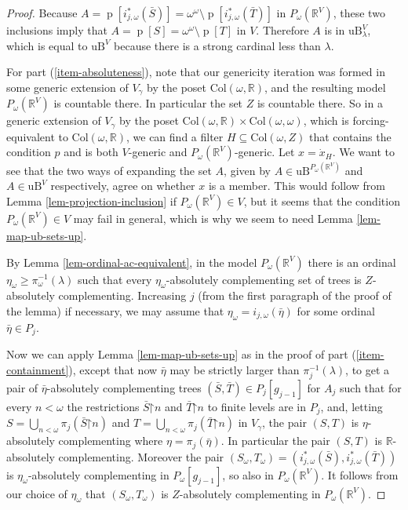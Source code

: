 \documentclass[fleqn, 11pt]{amsart}
\theoremstyle{plain}
\theoremstyle{definition}
\theoremstyle{remark}
\newcommand{\uB}{\mathrm{uB}}
\newcommand{\Col}{\mathrm{Col}}
\newcommand{\restrict}{\mathord{\restriction}}
\DeclareMathOperator{\p}{p}
\begin{document}
\begin{proof}
Because $A = \p[i_{j,\omega}^*(\bar{S})] = \omega^\omega \setminus \p[i_{j,\omega}^*(\bar{T})]$ in $P_\omega(\mathbb{R}^V)$, these two inclusions imply that $A = \p[S] = \omega^\omega \setminus \p[T]$ in $V$. Therefore $A$ is in $\uB_\lambda^V$, which is equal to $\uB^V$ because there is a strong cardinal less than $\lambda$.

For part (\ref{item-absoluteness}), note that our genericity iteration was formed in some generic extension of $V_{\gamma}$ by the poset $\Col(\omega,\mathbb{R})$, and the resulting model $P_\omega(\mathbb{R}^V)$ is countable there.  In particular the set $Z$ is countable there. So in a generic extension of $V_{\gamma}$ by the poset $\Col(\omega,\mathbb{R}) \times \Col(\omega,\omega)$, which is forcing-equivalent to $\Col(\omega,\mathbb{R})$, we can find a filter $H \subseteq \Col(\omega,Z)$ that contains the condition $p$ and is both $V$-generic and $P_\omega(\mathbb{R}^V)$-generic. Let $x = \dot{x}_H$. We want to see that the two ways of expanding the set $A$, given by $A \in \uB^{P_\omega(\mathbb{R}^V)}$ and $A \in \uB^V$ respectively, agree on whether $x$ is a member. This would follow from Lemma \ref{lem-projection-inclusion} if $P_\omega(\mathbb{R}^V) \in V$, but it seems that the condition $P_\omega(\mathbb{R}^V) \in V$ may fail in general, which is why we seem to need Lemma \ref{lem-map-ub-sets-up}.

By Lemma \ref{lem-ordinal-ac-equivalent}, in the model $P_\omega(\mathbb{R}^V)$ there is an ordinal $\eta_\omega \ge \pi_\omega^{-1}(\lambda)$ such that every $\eta_\omega$-absolutely complementing set of trees is $Z$-absolutely complementing. Increasing $j$ (from the first paragraph of the proof of the lemma) if necessary, we may assume that $\eta_\omega = i_{j,\omega}(\bar{\eta})$ for some ordinal $\bar{\eta} \in P_j$.

Now we can apply Lemma \ref{lem-map-ub-sets-up} as in the proof of
part (\ref{item-containment}), except that now $\bar{\eta}$ may be strictly larger than $\pi_j^{-1}(\lambda)$, to get a pair of $\bar{\eta}$-absolutely complementing trees $(\bar{S},\bar{T}) \in P_j[g_{j-1}]$ for $A_j$ such that for every $n < \omega$ the restrictions $\bar{S}\restrict n$ and $\bar{T} \restrict n$ to finite levels are in $P_j$, and, letting $S = \bigcup_{n<\omega} \pi_j(\bar{S}\restrict n)$ and $T = \bigcup_{n<\omega} \pi_j(\bar{T}\restrict n)$ in $V_{\gamma}$, the pair $(S,T)$ is $\eta$-absolutely complementing where $\eta = \pi_j(\bar{\eta})$. In particular the pair $(S,T)$ is $\mathbb{R}$-absolutely complementing. Moreover the pair $(S_{\omega}, T_{\omega}) = ( i_{j,\omega}^*(\bar{S}), i_{j,\omega}^*(\bar{T}))$ is $\eta_\omega$-absolutely complementing in $P_\omega[g_{j-1}]$, so also in $P_\omega(\mathbb{R}^V)$. It follows from our choice of $\eta_\omega$ that $(S_{\omega}, T_{\omega})$ is $Z$-absolutely complementing in $P_\omega(\mathbb{R}^V)$.


\end{proof}
\end{document}
